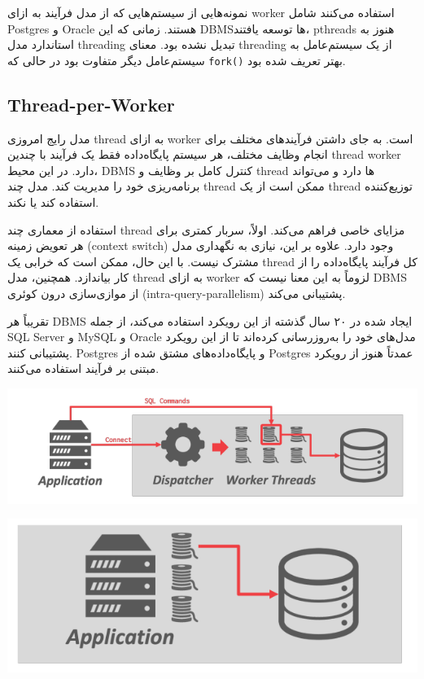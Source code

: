 نمونه‌هایی از سیستم‌هایی که از مدل فرآیند به ازای worker استفاده می‌کنند شامل Postgres و Oracle هستند. زمانی که این DBMSها توسعه یافتند، pthreads هنوز به استاندارد مدل threading تبدیل نشده بود. معنای threading از یک سیستم‌عامل به سیستم‌عامل دیگر متفاوت بود در حالی که \texttt{fork()} بهتر تعریف شده بود.

\subsection{Thread-per-Worker}
مدل رایج امروزی thread به ازای worker است. به جای داشتن فرآیندهای مختلف برای انجام وظایف مختلف، هر سیستم پایگاه‌داده فقط یک فرآیند با چندین thread worker دارد. در این محیط، DBMS کنترل کامل بر وظایف و thread ها دارد و می‌تواند برنامه‌ریزی خود را مدیریت کند. مدل چند thread ممکن است از یک thread توزیع‌کننده استفاده کند یا نکند.

استفاده از معماری چند thread مزایای خاصی فراهم می‌کند. اولاً، سربار کمتری برای هر تعویض زمینه (context switch) وجود دارد. علاوه بر این، نیازی به نگهداری مدل مشترک نیست. با این حال، ممکن است که خرابی یک thread کل فرآیند پایگاه‌داده را از کار بیاندازد. همچنین، مدل thread به ازای worker لزوماً به این معنا نیست که DBMS از موازی‌سازی درون کوئری 
(intra-query-parallelism) پشتیبانی می‌کند.

تقریباً هر DBMS ایجاد شده در ۲۰ سال گذشته از این رویکرد استفاده می‌کند، از جمله SQL Server  و MySQL و Oracle مدل‌های خود را به‌روزرسانی کرده‌اند تا از این رویکرد پشتیبانی کنند. Postgres و پایگاه‌داده‌های مشتق شده از Postgres عمدتاً هنوز از رویکرد مبتنی بر فرآیند استفاده می‌کنند.

\pagebreak

\qquad\qquad\qquad	\includegraphics[width=0.7\linewidth]{screenshot011}

\qquad\qquad\qquad	\includegraphics[width=0.7\linewidth]{screenshot012}

